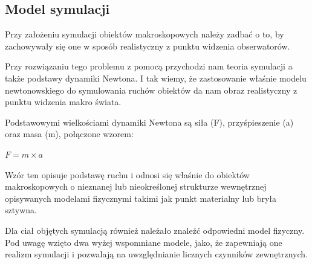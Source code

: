 \subsection{Model symulacji}
\par{
Przy założeniu symulacji obiektów makroskopowych należy zadbać o to, by zachowywały się one w sposób realistyczny z punktu widzenia obserwatorów.
}
\par{
Przy rozwiązaniu tego problemu z pomocą przychodzi nam teoria symulacji a także podstawy dynamiki Newtona.
I tak wiemy, że zastosowanie właśnie modelu newtonowskiego do symulowania ruchów obiektów da nam obraz realistyczny z punktu widzenia makro świata.
}
\par{
Podstawowymi wielkościami dynamiki Newtona są siła (F), przyśpieszenie (a) oraz masa (m), połączone wzorem:
\begin{center}
$F = m \times a$
\end{center}
Wzór ten opisuje podstawę ruchu i odnosi się właśnie do obiektów makroskopowych o nieznanej lub nieokreślonej strukturze wewnętrznej opisywanych modelami fizycznymi takimi jak punkt materialny lub bryła sztywna.
}
\par{
Dla ciał objętych symulacją również należało znaleźć odpowiedni model fizyczny. Pod uwagę wzięto dwa wyżej wspomniane modele, jako, że zapewniają one realizm symulacji i pozwalają na uwzględnianie licznych czynników zewnętrznych.
}
